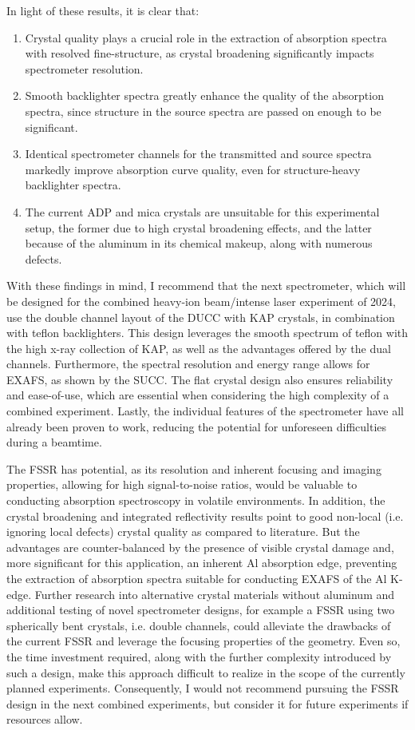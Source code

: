 In light of these results, it is clear that: 
\begin{enumerate}
	\item Crystal quality plays a crucial role in the extraction of absorption spectra with resolved fine-structure, as crystal broadening significantly impacts spectrometer resolution.
	\item Smooth backlighter spectra greatly enhance the quality of the absorption spectra, since structure in the source spectra are passed on enough to be significant.
	\item Identical spectrometer channels for the transmitted and source spectra markedly improve absorption curve quality, even for structure-heavy backlighter spectra.
	\item The current ADP and mica crystals are unsuitable for this experimental setup, the former due to high crystal broadening effects, and the latter because of the aluminum in its chemical makeup, along with numerous defects.
\end{enumerate}
With these findings in mind, I recommend that the next spectrometer, which will be designed for the combined heavy-ion beam/intense laser experiment of 2024, use the double channel layout of the DUCC with KAP crystals, in combination with teflon backlighters. This design leverages the smooth spectrum of teflon with the high x-ray collection of KAP, as well as the advantages offered by the dual channels. Furthermore, the spectral resolution and energy range allows for EXAFS, as shown by the SUCC. The flat crystal design also ensures reliability and ease-of-use, which are essential when considering the high complexity of a combined experiment. Lastly, the individual features of the spectrometer have all already been proven to work, reducing the potential for unforeseen difficulties during a beamtime.

The FSSR has potential, as its resolution and inherent focusing and imaging properties, allowing for high signal-to-noise ratios, would be valuable to conducting absorption spectroscopy in volatile environments. In addition, the crystal broadening and integrated reflectivity results point to good non-local (i.e. ignoring local defects) crystal quality as compared to literature. But the advantages are counter-balanced by the presence of visible crystal damage and, more significant for this application, an inherent Al absorption edge, preventing the extraction of absorption spectra suitable for conducting EXAFS of the Al K-edge. Further research into alternative crystal materials without aluminum and additional testing of novel spectrometer designs, for example a FSSR using two spherically bent crystals, i.e. double channels, could alleviate the drawbacks of the current FSSR and leverage the focusing properties of the geometry. Even so, the time investment required, along with the further complexity introduced by such a design, make this approach difficult to realize in the scope of the currently planned experiments. Consequently, I would not recommend pursuing the FSSR design in the next combined experiments, but consider it for future experiments if resources allow. 

